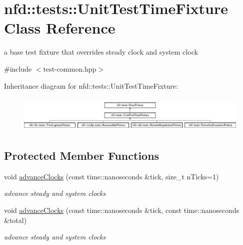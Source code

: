\hypertarget{classnfd_1_1tests_1_1UnitTestTimeFixture}{}\section{nfd\+:\+:tests\+:\+:Unit\+Test\+Time\+Fixture Class Reference}
\label{classnfd_1_1tests_1_1UnitTestTimeFixture}


a base test fixture that overrides steady clock and system clock  




{\ttfamily \#include $<$test-\/common.\+hpp$>$}

Inheritance diagram for nfd\+:\+:tests\+:\+:Unit\+Test\+Time\+Fixture\+:\begin{figure}[H]
\begin{center}
\leavevmode
\includegraphics[height=1.772152cm]{classnfd_1_1tests_1_1UnitTestTimeFixture}
\end{center}
\end{figure}
\subsection*{Protected Member Functions}
\begin{DoxyCompactItemize}
\item 
void \hyperlink{classnfd_1_1tests_1_1UnitTestTimeFixture_a87111cf01f8dd8e06a39f4c4ef3a3d50}{advance\+Clocks} (const time\+::nanoseconds \&tick, size\+\_\+t n\+Ticks=1)
\begin{DoxyCompactList}\small\item\em advance steady and system clocks \end{DoxyCompactList}\item 
void \hyperlink{classnfd_1_1tests_1_1UnitTestTimeFixture_a3c2b185e8496ceceed3a5dfffb1d6196}{advance\+Clocks} (const time\+::nanoseconds \&tick, const time\+::nanoseconds \&total)
\begin{DoxyCompactList}\small\item\em advance steady and system clocks \end{DoxyCompactList}\end{DoxyCompactItemize}
